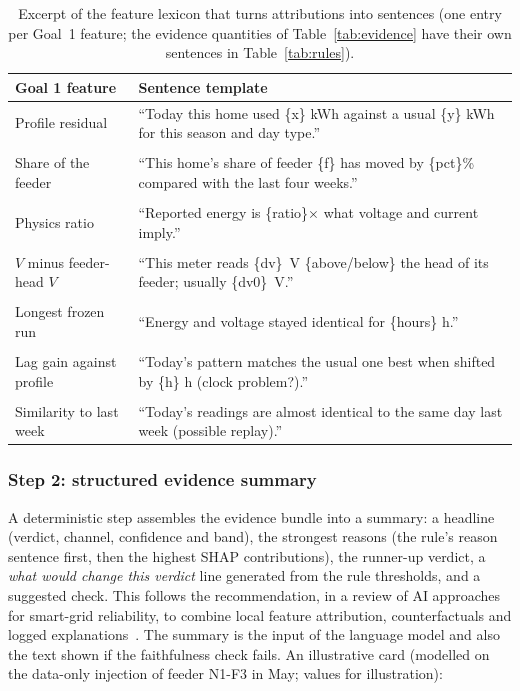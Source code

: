 \documentclass[11pt,a4paper]{article}
\begin{document}
\begin{table}[H]
\centering
\small
\begin{tabularx}{\textwidth}{@{}>{\raggedright\arraybackslash}p{3.6cm}L@{}}
\toprule
\textbf{Goal 1 feature} & \textbf{Sentence template} \\
\midrule
Profile residual & ``Today this home used \{x\} kWh against a usual \{y\} kWh for this season and day type.'' \\ \\
Share of the feeder & ``This home's share of feeder \{f\} has moved by \{pct\}\% compared with the last four weeks.'' \\ \\
Physics ratio & ``Reported energy is \{ratio\}$\times$ what voltage and current imply.'' \\ \\
$V$ minus feeder-head $V$ & ``This meter reads \{dv\}~V \{above/below\} the head of its feeder; usually \{dv0\}~V.'' \\ \\
Longest frozen run & ``Energy and voltage stayed identical for \{hours\} h.'' \\ \\
Lag gain against profile & ``Today's pattern matches the usual one best when shifted by \{h\} h (clock problem?).'' \\ \\
Similarity to last week & ``Today's readings are almost identical to the same day last week (possible replay).'' \\
\bottomrule
\end{tabularx}
\caption{Excerpt of the feature lexicon that turns attributions into sentences (one entry per Goal~1
feature; the evidence quantities of Table~\ref{tab:evidence} have their own sentences in
Table~\ref{tab:rules}).}
\label{tab:lexicon}
\end{table}

\subsubsection*{Step 2: structured evidence summary}
A deterministic step assembles the evidence bundle into a summary: a headline (verdict, channel, confidence
and band), the strongest reasons (the rule's reason sentence first, then the highest SHAP contributions), the
runner-up verdict, a \emph{what would change this verdict} line generated from the rule thresholds, and a
suggested check. This follows the recommendation, in a review of AI approaches for smart-grid reliability, to
combine local feature attribution, counterfactuals and logged explanations~\cite{review2025}. The summary is the
input of the language model and also the text shown if the faithfulness check fails. An illustrative card
(modelled on the data-only injection of feeder N1-F3 in May; values for illustration):
\end{document}
